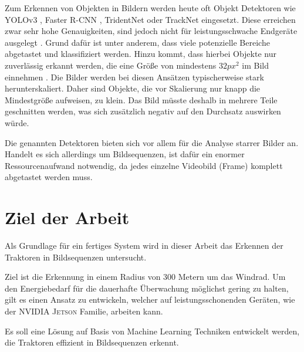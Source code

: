 \bigskip
Zum Erkennen von Objekten in Bildern werden heute oft Objekt Detektoren wie YOLOv3 \cite{redmon_yolov3:_2018}, Faster R-CNN \cite{ren_faster_2015}, TridentNet \cite{li_scale-aware_2019} oder TrackNet \cite{li_tracknet:_2019} eingesetzt.
Diese erreichen zwar sehr hohe Genauigkeiten, sind jedoch nicht für leistungsschwache Endgeräte ausgelegt \cite{hossain_deep_2019}.
Grund dafür ist unter anderem, dass viele potenzielle Bereiche  abgetastet und klassifiziert werden.
Hinzu kommt, dass hierbei Objekte nur zuverlässig erkannt werden, die eine Größe von mindestens $32px^2$ im Bild einnehmen \cite{wu_recent_2019}.
Die Bilder werden bei diesen Ansätzen typischerweise stark herunterskaliert.
Daher sind Objekte, die vor Skalierung nur knapp die Mindestgröße aufweisen, zu klein.
Das Bild müsste deshalb in mehrere Teile geschnitten werden, was sich zusätzlich negativ auf den Durchsatz auswirken würde.

Die genannten Detektoren bieten sich vor allem für die Analyse starrer Bilder an.
Handelt es sich allerdings um Bildsequenzen, ist dafür ein enormer Ressourcenaufwand notwendig, da jedes einzelne Videobild (Frame) komplett abgetastet werden muss.

\section{Ziel der Arbeit}
Als Grundlage für ein fertiges System wird in dieser Arbeit das Erkennen der Traktoren in Bildsequenzen untersucht.

Ziel ist die Erkennung in einem Radius von $300$ Metern um das Windrad.
Um den Energiebedarf für die dauerhafte Überwachung möglichst gering zu halten, gilt es einen Ansatz zu entwickeln, welcher auf leistungsschonenden Geräten, wie der \textsc{NVIDIA Jetson} Familie, arbeiten kann.

Es soll eine Lösung auf Basis von Machine Learning Techniken entwickelt werden, die Traktoren effizient in Bildsequenzen erkennt.

